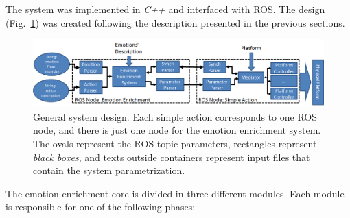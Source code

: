 The system was implemented in \textit{C++} and interfaced with ROS. The design (Fig.~\ref{fig:system_architecture}) was created following the description presented in the previous sections. 
\begin{figure}
	\centering
	\includegraphics[width=1.0\textwidth]{Images/SystemArchitecture.png} 	
	\caption{General system design. Each simple action corresponds to one ROS node, and there is just one node for the emotion enrichment system. The ovals represent the ROS topic parameters, rectangles represent \textit{black boxes}, and texts outside containers represent input files that contain the system parametrization.}
	\label{fig:system_architecture}
\end{figure}
The emotion enrichment core is divided in three different modules. 
Each module is responsible for one of the following phases:
